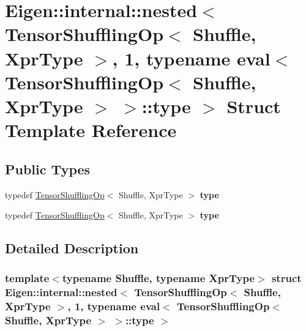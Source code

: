 \hypertarget{struct_eigen_1_1internal_1_1nested_3_01_tensor_shuffling_op_3_01_shuffle_00_01_xpr_type_01_4_00_dada54f27507131254ad9331d623790d}{}\section{Eigen\+:\+:internal\+:\+:nested$<$ Tensor\+Shuffling\+Op$<$ Shuffle, Xpr\+Type $>$, 1, typename eval$<$ Tensor\+Shuffling\+Op$<$ Shuffle, Xpr\+Type $>$ $>$\+:\+:type $>$ Struct Template Reference}
\label{struct_eigen_1_1internal_1_1nested_3_01_tensor_shuffling_op_3_01_shuffle_00_01_xpr_type_01_4_00_dada54f27507131254ad9331d623790d}
\subsection*{Public Types}
\begin{DoxyCompactItemize}
\item 
\mbox{\label{struct_eigen_1_1internal_1_1nested_3_01_tensor_shuffling_op_3_01_shuffle_00_01_xpr_type_01_4_00_dada54f27507131254ad9331d623790d_ad35ed153a99eef1a339316ecd77c945c}} 
typedef \hyperlink{class_eigen_1_1_tensor_shuffling_op}{Tensor\+Shuffling\+Op}$<$ Shuffle, Xpr\+Type $>$ {\bfseries type}
\item 
\mbox{\label{struct_eigen_1_1internal_1_1nested_3_01_tensor_shuffling_op_3_01_shuffle_00_01_xpr_type_01_4_00_dada54f27507131254ad9331d623790d_ad35ed153a99eef1a339316ecd77c945c}} 
typedef \hyperlink{class_eigen_1_1_tensor_shuffling_op}{Tensor\+Shuffling\+Op}$<$ Shuffle, Xpr\+Type $>$ {\bfseries type}
\end{DoxyCompactItemize}


\subsection{Detailed Description}
\subsubsection*{template$<$typename Shuffle, typename Xpr\+Type$>$\newline
struct Eigen\+::internal\+::nested$<$ Tensor\+Shuffling\+Op$<$ Shuffle, Xpr\+Type $>$, 1, typename eval$<$ Tensor\+Shuffling\+Op$<$ Shuffle, Xpr\+Type $>$ $>$\+::type $>$}



